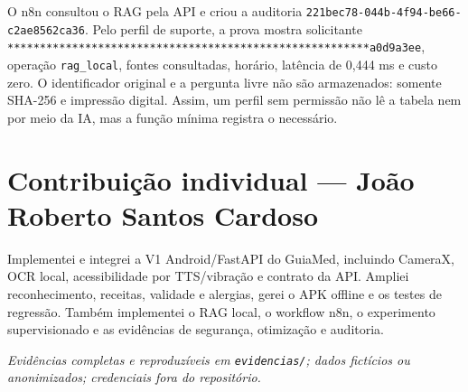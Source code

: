 \documentclass[10pt,a4paper]{article}
\begin{document}
O n8n consultou o RAG pela API e criou a auditoria \texttt{221bec78-044b-4f94-be66-c2ae8562ca36}. Pelo perfil de suporte, a prova mostra solicitante \texttt{********************************************************a0d9a3ee}, operação \texttt{rag\_local}, fontes consultadas, horário, latência de 0,444 ms e custo zero. O identificador original e a pergunta livre não são armazenados: somente SHA-256 e impressão digital. Assim, um perfil sem permissão não lê a tabela nem por meio da IA, mas a função mínima registra o necessário.

\section*{Contribuição individual --- João Roberto Santos Cardoso}

Implementei e integrei a V1 Android/FastAPI do GuiaMed, incluindo CameraX, OCR local, acessibilidade por TTS/vibração e contrato da API. Ampliei reconhecimento, receitas, validade e alergias, gerei o APK offline e os testes de regressão. Também implementei o RAG local, o workflow n8n, o experimento supervisionado e as evidências de segurança, otimização e auditoria.

\small\textit{Evidências completas e reproduzíveis em \texttt{evidencias/}; dados fictícios ou anonimizados; credenciais fora do repositório.}
\end{document}
